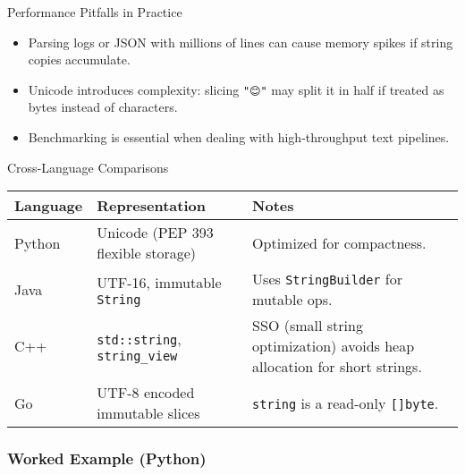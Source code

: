 \documentclass[
  letterpaper,
  DIV=11,
  numbers=noendperiod]{scrreprt}
\providecommand{\tightlist}{%
  \setlength{\itemsep}{0pt}\setlength{\parskip}{0pt}}
\begin{document}
Performance Pitfalls in Practice

\begin{itemize}
\tightlist
\item
  Parsing logs or JSON with millions of lines can cause memory spikes if
  string copies accumulate.
\item
  Unicode introduces complexity: slicing \texttt{"😊"} may split it in
  half if treated as bytes instead of characters.
\item
  Benchmarking is essential when dealing with high-throughput text
  pipelines.
\end{itemize}

Cross-Language Comparisons

\begin{longtable}[]{@{}
  >{\raggedright\arraybackslash}p{}
  >{\raggedright\arraybackslash}p{}
  >{\raggedright\arraybackslash}p{}@{}}
\toprule\noalign{}
\begin{minipage}[b]{\linewidth}\raggedright
Language
\end{minipage} & \begin{minipage}[b]{\linewidth}\raggedright
Representation
\end{minipage} & \begin{minipage}[b]{\linewidth}\raggedright
Notes
\end{minipage} \\
\midrule\noalign{}
\endhead
\bottomrule\noalign{}
\endlastfoot
Python & Unicode (PEP 393 flexible storage) & Optimized for
compactness. \\
Java & UTF-16, immutable \texttt{String} & Uses \texttt{StringBuilder}
for mutable ops. \\
C++ & \texttt{std::string}, \texttt{string\_view} & SSO (small string
optimization) avoids heap allocation for short strings. \\
Go & UTF-8 encoded immutable slices & \texttt{string} is a read-only
\texttt{{[}{]}byte}. \\
\end{longtable}

\subsubsection{Worked Example (Python)}\label{worked-example-python-5}
\end{document}
